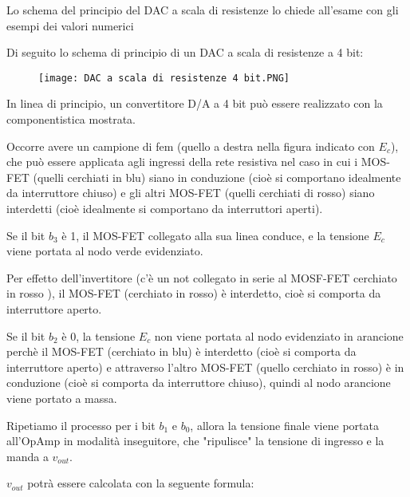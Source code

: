 \begin{tcolorbox}
    Lo schema del principio del DAC a scala di resistenze lo chiede all'esame con gli esempi dei valori numerici
\end{tcolorbox}


Di seguito lo schema di principio di un DAC a scala di resistenze a 4 bit: 

\begin{figure}[h]
    \centering
    \texttt{[image: DAC a scala di resistenze 4 bit.PNG]}
\end{figure}

In linea di principio, un convertitore D/A a 4 bit può essere realizzato con la componentistica mostrata. \newline 

Occorre avere un campione di fem (quello a destra nella figura indicato con $E_c$), 
che può essere applicata agli ingressi della rete resistiva nel caso in cui i MOS-FET (quelli cerchiati in blu) siano in conduzione (cioè si comportano idealmente da interruttore chiuso) e gli altri MOS-FET (quelli cerchiati di rosso) siano interdetti (cioè idealmente si comportano da interruttori aperti). \newline 

Se il bit $b_3$ è 1, il MOS-FET collegato alla sua linea conduce, 
e la tensione $E_c$ viene portata al nodo verde evidenziato. \newline 

Per effetto dell'invertitore (c'è un not collegato in serie al MOSF-FET cerchiato in rosso ), 
il MOS-FET (cerchiato in rosso) è interdetto, cioè si comporta da interruttore aperto.\newline 

Se il bit $b_2$ è 0, la tensione $E_c$ non viene portata al nodo evidenziato in arancione perchè il MOS-FET (cerchiato in blu) è interdetto 
(cioè si comporta da interruttore aperto) e attraverso l'altro MOS-FET (quello cerchiato in rosso) è in conduzione (cioè si comporta da interruttore chiuso), 
quindi al nodo arancione viene portato a massa. \newline 

Ripetiamo il processo per i bit $b_1$ e $b_0$, allora la tensione finale viene portata all'OpAmp in modalità inseguitore, 
che "ripulisce" la tensione di ingresso e la manda a $v_{out}$. \newline 

$v_{out}$ potrà essere calcolata con la seguente formula: 

